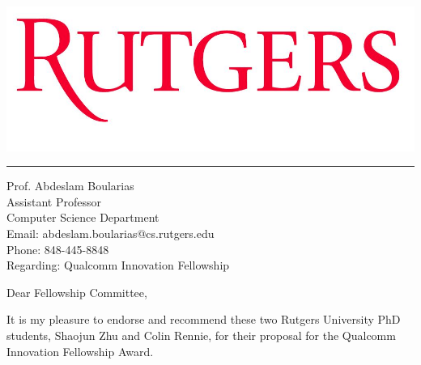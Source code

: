 \documentclass{letter} %
\begin{document}
\longindentation=0pt                       %
\let\raggedleft\raggedright                %

\begin{letter}{}

\begin{minipage}[b]{0.3\linewidth}
\includegraphics[scale=0.1]{Rutgers-logo.jpg}
\end{minipage}

\medskip\hrule height 1pt
\begin{flushright}
\hfill Prof. Abdeslam Boularias\\
\hfill Assistant Professor\\
\hfill Computer Science Department \\
\hfill Email: abdeslam.boularias@cs.rutgers.edu \\
\hfill Phone: 848-445-8848\\
\vspace{0.5cm}
\hfill Regarding: Qualcomm Innovation Fellowship
\end{flushright}

\opening{Dear Fellowship Committee,}

\noindent 

It is my pleasure to endorse and recommend these two Rutgers University PhD students, 
Shaojun Zhu and Colin Rennie, for their proposal for the Qualcomm Innovation Fellowship Award.



\end{letter}
\end{document}
